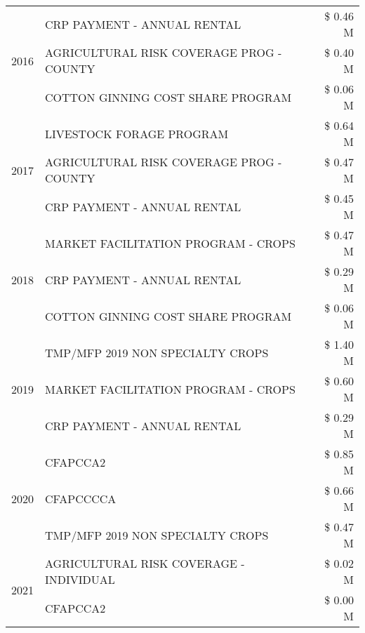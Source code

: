 \begin{tabular}{llr}
\cline{1-3}
\multirow[t]{3}{*}{2016} & CRP PAYMENT - ANNUAL RENTAL & \$ 0.46 M \\
 & AGRICULTURAL RISK COVERAGE PROG - COUNTY & \$ 0.40 M \\
 & COTTON GINNING COST SHARE PROGRAM & \$ 0.06 M \\
\cline{1-3}
\multirow[t]{3}{*}{2017} & LIVESTOCK FORAGE PROGRAM & \$ 0.64 M \\
 & AGRICULTURAL RISK COVERAGE PROG - COUNTY & \$ 0.47 M \\
 & CRP PAYMENT - ANNUAL RENTAL & \$ 0.45 M \\
\cline{1-3}
\multirow[t]{3}{*}{2018} & MARKET FACILITATION PROGRAM - CROPS & \$ 0.47 M \\
 & CRP PAYMENT - ANNUAL RENTAL & \$ 0.29 M \\
 & COTTON GINNING COST SHARE PROGRAM & \$ 0.06 M \\
\cline{1-3}
\multirow[t]{3}{*}{2019} & TMP/MFP 2019 NON SPECIALTY CROPS & \$ 1.40 M \\
 & MARKET FACILITATION PROGRAM - CROPS & \$ 0.60 M \\
 & CRP PAYMENT - ANNUAL RENTAL & \$ 0.29 M \\
\cline{1-3}
\multirow[t]{3}{*}{2020} & CFAPCCA2 & \$ 0.85 M \\
 & CFAPCCCCA & \$ 0.66 M \\
 & TMP/MFP 2019 NON SPECIALTY CROPS & \$ 0.47 M \\
\cline{1-3}
\multirow[t]{2}{*}{2021} & AGRICULTURAL RISK COVERAGE - INDIVIDUAL & \$ 0.02 M \\
 & CFAPCCA2 & \$ 0.00 M \\
\cline{1-3}
\bottomrule
\end{tabular}
